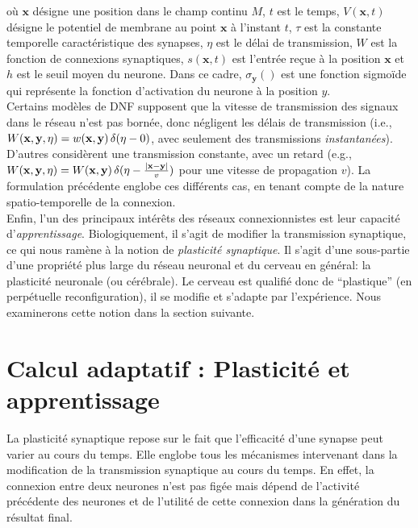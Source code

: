 où $\mathbf {x}$ désigne une position dans le champ continu $M$, $t$ est le temps, $V(\mathbf{x},t)$ désigne le potentiel de membrane au point $\mathbf {x}$ à l'instant $t$, $ {\tau} $ est la constante temporelle caractéristique des synapses, $\eta$ est le délai de transmission, $ W $ est la fonction de connexions synaptiques, $ s(\mathbf {x},t) $ est l'entrée reçue à la position $ \mathbf {x} $ et $ h $ est le seuil moyen du neurone. Dans ce cadre, $ \sigma_ {\mathbf{y}} ()$ est une fonction sigmoïde qui représente la fonction d'activation du neurone à la position $y$. \\

Certains modèles de DNF supposent que la vitesse de transmission des signaux dans le réseau n'est pas bornée, donc négligent les délais de transmission (i.e., $W({\bf x}, {\bf y}, \eta) = w({\bf x}, {\bf y}) \, \delta(\eta - 0)$, avec seulement des transmissions \textit{instantanées}). D'autres considèrent une transmission constante, avec un retard (e.g., $W({\bf x}, {\bf y}, \eta) = W({\bf x}, {\bf y}) \, \delta(\eta - \frac{|{\bf x} - {\bf y}|}{v})$ pour une vitesse de propagation $v$). La formulation précédente englobe ces différents cas, en tenant compte de la nature spatio-temporelle de la connexion. \\

Enfin, l'un des principaux intérêts des réseaux connexionnistes est leur capacité d'\textit{apprentissage}. Biologiquement, il s'agit de modifier la transmission synaptique, ce qui nous ramène à la notion de \textit{plasticité synaptique}.  Il s'agit d'une sous-partie d'une propriété plus large du réseau neuronal et du cerveau en général: la plasticité neuronale (ou cérébrale). Le cerveau est qualifié donc de ``plastique'' (en perpétuelle reconfiguration), il se modifie et s'adapte par l'expérience. Nous examinerons cette notion dans la section suivante.\\


\section {Calcul adaptatif : Plasticité et apprentissage}
 

La plasticité synaptique repose sur le fait que l'efficacité d'une synapse peut varier au cours du temps. Elle englobe tous les mécanismes intervenant dans la modification de la transmission synaptique au cours du temps. En effet, la connexion entre deux neurones n'est pas figée mais dépend de l'activité précédente des neurones et de l'utilité de cette connexion dans la génération du résultat final. \\

